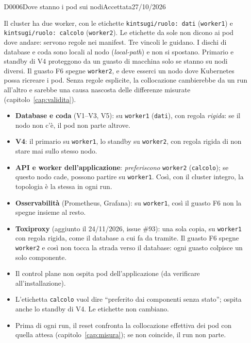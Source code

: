 \begin{decisione}{D0006}{Dove stanno i pod sui nodi}{Accettata}{27/10/2026}

\contesto
Il cluster ha due worker, con le etichette \texttt{kintsugi/ruolo: dati} (\texttt{worker1}) e \texttt{kintsugi/ruolo: calcolo} (\texttt{worker2}). Le etichette da sole non dicono ai pod dove andare: servono regole nei manifest. Tre vincoli le guidano. I dischi di database e coda sono locali al nodo (\textit{local-path}) e non si spostano. Primario e standby di V4 proteggono da un guasto di macchina solo se stanno su nodi diversi. Il guasto F6 spegne \texttt{worker2}, e deve esserci un nodo dove Kubernetes possa ricreare i pod. Senza regole esplicite, la collocazione cambierebbe da un run all'altro e sarebbe una causa nascosta delle differenze misurate (capitolo~\ref{cap:validita}).

\scelta
\begin{itemize}
  \item \textbf{Database e coda} (V1--V3, V5): su \texttt{worker1} (\texttt{dati}), con regola \emph{rigida}: se il nodo non c'è, il pod non parte altrove.
  \item \textbf{V4}: il primario su \texttt{worker1}, lo standby su \texttt{worker2}, con regola rigida di non stare mai sullo stesso nodo.
  \item \textbf{API e worker dell'applicazione}: \emph{preferiscono} \texttt{worker2} (\texttt{calcolo}); se questo nodo cade, possono partire su \texttt{worker1}. Così, con il cluster integro, la topologia è la stessa in ogni run.
  \item \textbf{Osservabilità} (Prometheus, Grafana): su \texttt{worker1}, così il guasto F6 non la spegne insieme al resto.
  \item \textbf{Toxiproxy} (aggiunto il 24/11/2026, issue \#93): una sola copia, su \texttt{worker1} con regola rigida, come il database a cui fa da tramite. Il guasto F6 spegne \texttt{worker2} e così non tocca la strada verso il database: ogni guasto colpisce un solo componente.
  \item Il control plane non ospita pod dell'applicazione (da verificare all'installazione).
  \item L'etichetta \texttt{calcolo} vuol dire ``preferito dai componenti senza stato''; ospita anche lo standby di V4. Le etichette non cambiano.
  \item Prima di ogni run, il reset confronta la collocazione effettiva dei pod con quella attesa (capitolo~\ref{cap:misura}); se non coincide, il run non parte.
\end{itemize}


\end{decisione}
